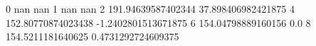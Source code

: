 0 nan nan
1 nan nan
2 191.94639587402344 37.898406982421875
4 152.80770874023438 -1.2402801513671875
6 154.04798889160156 0.0
8 154.5211181640625 0.4731292724609375
